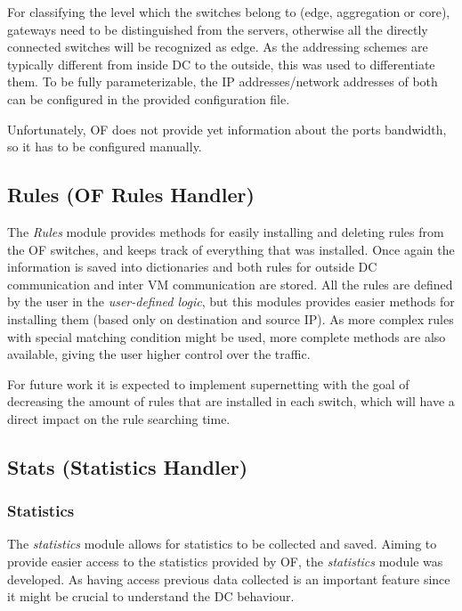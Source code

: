 \documentclass[12pt,english,oneside]{book}
\begin{document}
For classifying the level which the switches belong to (edge, aggregation or core), gateways need to be distinguished from the servers, otherwise all the directly connected switches will be recognized as edge. As the addressing schemes are typically different from inside DC to the outside, this was used to differentiate them. To be fully parameterizable, the IP addresses/network addresses of both can be configured in the provided configuration file.

Unfortunately, OF does not provide yet information about the ports bandwidth, so it has to be configured manually.
\subsection{Rules (OF Rules Handler)}
\hspace{0.6cm}

The \textit{Rules} module provides methods for easily installing and deleting rules from the OF switches, and keeps track of everything that was installed.
Once again the information is saved into dictionaries and both rules for outside DC communication and inter VM communication are stored.
All the rules are defined by the user in the \textit{user-defined logic}, but this modules provides easier methods for installing them (based only on destination and source IP). As more complex rules with special matching condition might be used, more complete methods are also available, giving the user higher control over the traffic.

For future work it is expected to implement supernetting with the goal of decreasing the amount of rules that are installed in each switch, which will have a direct impact on the rule searching time.

\newpage
\subsection{Stats (Statistics Handler)}

\subsubsection{Statistics}
\hspace{0.6cm}

The \textit{statistics} module allows for statistics to be collected and saved.
Aiming to provide easier access to the statistics provided by OF, the \textit{statistics} module was developed.
As having access previous data collected is an important feature since it might be crucial to understand the DC behaviour.
\end{document}
